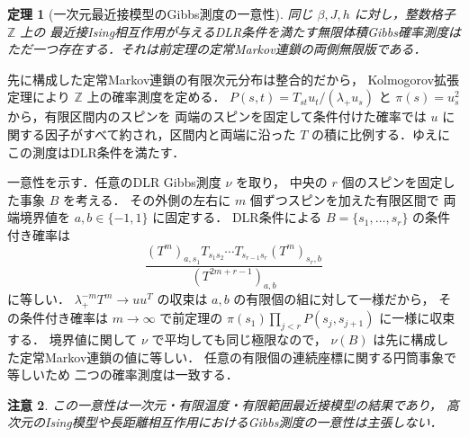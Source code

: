 \documentclass[a5paper,10pt,onecolumn]{jsarticle}
\makeatletter
\theoremstyle{mathnotetheorem}
\newtheorem{theorem}{定理}[section]
\newtheorem{remark}[theorem]{注意}
\renewcommand{\proofname}{証明}
\renewenvironment{proof}[1][\proofname]{%
  \par\pushQED{\qed}\normalfont\topsep4\p@\@plus2\p@\relax
  \trivlist\item[\hskip\labelsep\bfseries #1]\ignorespaces
}{\popQED\endtrivlist\@endpefalse}
\makeatother
\begin{document}
\begin{theorem}[一次元最近接模型のGibbs測度の一意性]
同じ $\beta,J,h$ に対し，整数格子 $\mathbb Z$ 上の
最近接Ising相互作用が与えるDLR条件を満たす無限体積Gibbs確率測度は
ただ一つ存在する．それは前定理の定常Markov連鎖の両側無限版である．
\end{theorem}
\begin{proof}
先に構成した定常Markov連鎖の有限次元分布は整合的だから，
Kolmogorov拡張定理により $\mathbb Z$ 上の確率測度を定める．
$P(s,t)=T_{st}u_t/(\lambda_+u_s)$ と
$\pi(s)=u_s^2$ から，有限区間内のスピンを
両端のスピンを固定して条件付けた確率では
$u$ に関する因子がすべて約され，区間内と両端に沿った
$T$ の積に比例する．ゆえにこの測度はDLR条件を満たす．

一意性を示す．任意のDLR Gibbs測度 $\nu$ を取り，
中央の $r$ 個のスピンを固定した事象 $B$ を考える．
その外側の左右に $m$ 個ずつスピンを加えた有限区間で
両端境界値を $a,b\in\{-1,1\}$ に固定する．
DLR条件による $B=\{s_1,\ldots,s_r\}$ の条件付き確率は
\[
 \frac{(T^m)_{a,s_1}T_{s_1s_2}\cdots
             T_{s_{r-1}s_r}(T^m)_{s_r,b}}
 {(T^{2m+r-1})_{a,b}}
\]
に等しい．
$\lambda_+^{-m}T^m\to uu^T$ の収束は
$a,b$ の有限個の組に対して一様だから，
その条件付き確率は $m\to\infty$ で前定理の
$\pi(s_1)\prod_{j<r}P(s_j,s_{j+1})$ に一様に収束する．
境界値に関して $\nu$ で平均しても同じ極限なので，
$\nu(B)$ は先に構成した定常Markov連鎖の値に等しい．
任意の有限個の連続座標に関する円筒事象で等しいため
二つの確率測度は一致する．
\end{proof}
\begin{remark}
この一意性は一次元・有限温度・有限範囲最近接模型の結果であり，
高次元のIsing模型や長距離相互作用におけるGibbs測度の一意性は主張しない．
\end{remark}
\end{document}
